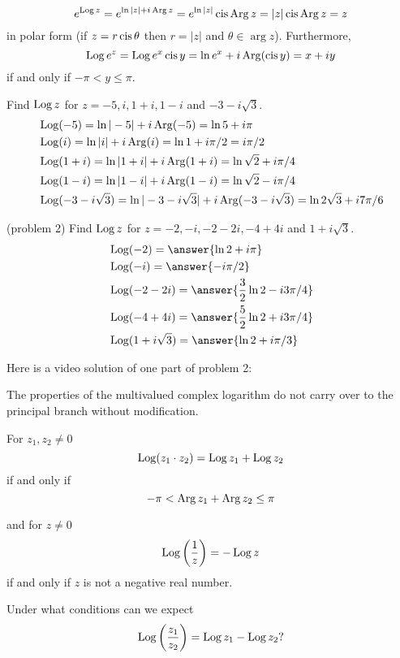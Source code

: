 \documentclass[handout]{ximera}
\begin{document}
\[
e^{\operatorname{Log} z} = e^{\ln |z| + i\operatorname{Arg} z} = e^{\ln |z|} \operatorname{cis} \operatorname{Arg} z = |z| \operatorname{cis} \operatorname{Arg} z =z
\]
in polar form (if $z=r\operatorname{cis} \theta$ then $r = |z|$ and $\theta \in \arg z$).
Furthermore,
\[
\operatorname{Log} e^z = \operatorname{Log} e^x\operatorname{cis} y = \ln e^x + i\operatorname{Arg}(\operatorname{cis} y) = x+iy
\]
if and only if $-\pi < y \leq \pi$.




\begin{example}[Example 2] 
Find $\operatorname{Log} z$ for $z = -5, i, 1+i, 1-i$ and $-3-i\sqrt 3$.\\
\begin{align*}
& \operatorname{Log}(-5) = \ln|-5|+ i \operatorname{Arg}(-5) = \ln 5 + i\pi\\
& \operatorname{Log}(i) = \ln|i|+ i \operatorname{Arg}(i) = \ln 1 + i\pi/2 = i\pi/2\\
& \operatorname{Log}(1+i) = \ln|1+i|+ i \operatorname{Arg}(1+i) = \ln \sqrt 2 + i\pi/4\\
& \operatorname{Log}(1-i) = \ln|1-i|+ i \operatorname{Arg}(1-i) = \ln \sqrt 2 - i\pi/4\\
& \operatorname{Log}(-3-i\sqrt 3) = \ln|-3-i\sqrt 3|+ i \operatorname{Arg}(-3-i\sqrt 3) = \ln 2\sqrt 3 + i7\pi/6
\end{align*}
\end{example}


\begin{problem}(problem 2) 
Find $\operatorname{Log} z$ for $z = -2, -i, -2-2i, -4+4i$ and $1+i\sqrt 3$.\\
\begin{align*}
& \Log(-2) = \answer{\ln 2 + i\pi }\\
& \Log(-i) = \answer{-i\pi/2}\\
& \Log(-2-2i) = \answer{\frac 32 \ln 2 - i3\pi/4}\\
& \Log(-4+4i) = \answer{\frac52 \ln 2 +i3\pi/4}\\
& \Log(1+i\sqrt 3) = \answer{\ln 2+ i\pi/3}
\end{align*}
\end{problem}

Here is a video solution of one part of problem 2:\\
\begin{foldable}
\end{foldable}

The properties of the multivalued complex logarithm do not carry over to the principal branch without modification.
\begin{proposition}
For $z_1, z_2 \neq 0$
\[\operatorname{Log}(z_1\cdot z_2) = \operatorname{Log} z_1 + \operatorname{Log} z_2
\]
if and only if 
\[
-\pi < \operatorname{Arg} z_1 + \operatorname{Arg} z_2 \leq \pi\]

and for $z \neq 0$
\[
\operatorname{Log}\left(\frac{1}{z}\right) = - \operatorname{Log} z
\]
if and only if $z$ is not a negative real number.
\end{proposition}
\begin{question}Under what conditions can we expect
\[
\operatorname{Log}\left(\frac{z_1}{z_2}\right) = \operatorname{Log} z_1 - \operatorname{Log} z_2?
\]
\end{question}
\end{document}
